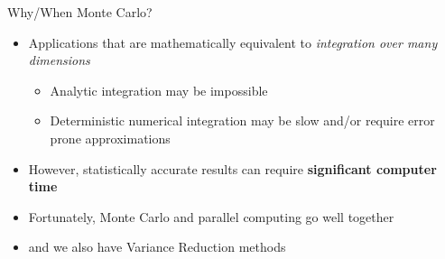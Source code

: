 \documentclass[xcolor=x11names,compress, handout]{beamer}
\renewcommand{\(}{\begin{columns}}
\renewcommand{\)}{\end{columns}}
\newcommand{\<}[1]{\begin{column}{#1}}
\renewcommand{\>}{\end{column}}
\begin{document}
\begin{frame}{Why/When Monte Carlo?}

\begin{itemize}
\item Applications that are mathematically equivalent to \textit{integration over many dimensions}
\vspace*{0.25 em}
\begin{itemize}
\item Analytic integration may be impossible
\vspace*{0.25 em}
\item Deterministic numerical integration may be slow and/or require error prone approximations
\end{itemize} 
\vspace*{0.5 em}
\pause
\item However, statistically accurate results can require \textbf{significant computer time}
\item Fortunately, Monte Carlo and parallel computing go well together
\item and we also have Variance Reduction methods
\end{itemize}

\end{frame}
\end{document}
